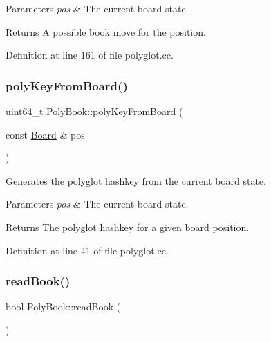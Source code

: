 \begin{DoxyParams}{Parameters}
{\em pos} & The current board state. \\
\hline
\end{DoxyParams}
\begin{DoxyReturn}{Returns}
A possible book move for the position. 
\end{DoxyReturn}


Definition at line 161 of file polyglot.\+cc.

\mbox{\label{classPolyBook_a787f1b994ee7f1fd68c482c2de32e568}} 
\subsubsection{\texorpdfstring{poly\+Key\+From\+Board()}{polyKeyFromBoard()}}
{\footnotesize\ttfamily uint64\+\_\+t Poly\+Book\+::poly\+Key\+From\+Board (\begin{DoxyParamCaption}\item[{const \mbox{\hyperlink{classBoard}{Board}} \&}]{pos }\end{DoxyParamCaption})\hspace{0.3cm}{\ttfamily [private]}}



Generates the polyglot hashkey from the current board state. 


\begin{DoxyParams}{Parameters}
{\em pos} & The current board state. \\
\hline
\end{DoxyParams}
\begin{DoxyReturn}{Returns}
The polyglot hashkey for a given board position. 
\end{DoxyReturn}


Definition at line 41 of file polyglot.\+cc.

\mbox{\label{classPolyBook_ac9eaa321dd857646c059b84aa67f5c9b}} 
\subsubsection{\texorpdfstring{read\+Book()}{readBook()}}
{\footnotesize\ttfamily bool Poly\+Book\+::read\+Book (\begin{DoxyParamCaption}{ }\end{DoxyParamCaption})}



